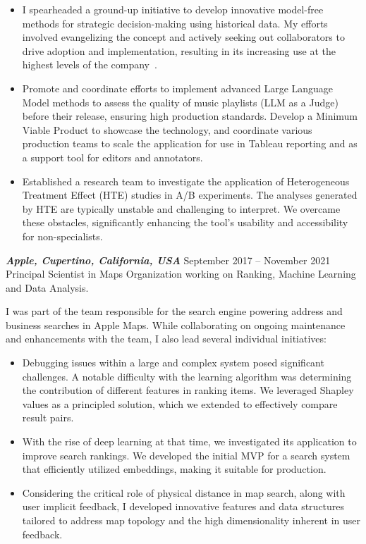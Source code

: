 \documentclass[10pt]{res} %
\begin{document}
\begin{resume}
\begin{itemize}
\item I spearheaded a ground-up initiative to develop innovative
  model-free methods for strategic decision-making using historical
  data. My efforts involved evangelizing the concept and actively
  seeking out collaborators to drive adoption and implementation,
  resulting in its increasing use at the highest levels of the
  company~\cite{dupret2024fortune}.
\item Promote and coordinate efforts to implement advanced Large
  Language Model methods to assess the quality of music playlists (LLM
  as a Judge) before their release, ensuring high production
  standards. Develop a Minimum Viable Product to showcase the
  technology, and coordinate various production teams to scale the
  application for use in Tableau reporting and as a support tool for
  editors and annotators.
\item Established a research team to investigate the application of
  Heterogeneous Treatment Effect (HTE) studies in A/B experiments. The
  analyses generated by HTE are typically unstable and challenging to
  interpret. We overcame these obstacles, significantly enhancing the
  tool's usability and accessibility for non-specialists.
\end{itemize}


{\sl \textbf{Apple, Cupertino, California, USA}} \hfill September 2017 -- November 2021 \\
Principal Scientist in Maps Organization working on Ranking, Machine Learning and Data Analysis.

I was part of the team responsible for the search engine powering
address and business searches in Apple Maps. While collaborating on
ongoing maintenance and enhancements with the team, I also
lead several individual initiatives:

\vspace{8pt}

\begin{itemize}
\item Debugging issues within a large and complex system posed
  significant challenges. A notable difficulty with the learning
  algorithm was determining the contribution of different features in
  ranking items. We leveraged Shapley values as a principled solution,
  which we extended to effectively compare result pairs.
\item With the rise of deep learning at that time, we investigated its
  application to improve search rankings. We developed the initial MVP
  for a search system that efficiently utilized embeddings, making it
  suitable for production.
\item Considering the critical role of physical distance in map search,
  along with user implicit feedback, I developed innovative features and
  data structures tailored to address map topology and the high
  dimensionality inherent in user feedback.
\end{itemize}


\end{resume}
\end{document}
